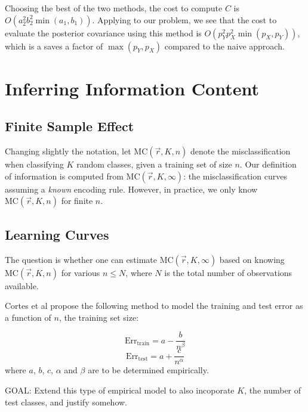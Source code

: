 \documentclass[12pt]{article}
\begin{document}
Choosing the best of the two methods, the cost to compute $C$ is $O(a_2^2 b_2^2 \min(a_1, b_1))$.
Applying to our problem, we see that the cost to evaluate the posterior covariance using this method is $O(p_Y^2 p_X^2 \min(p_X, p_Y))$, which is a saves a factor of $\max(p_Y, p_X)$ compared to the naive approach.


\section{Inferring Information Content}

\subsection{Finite Sample Effect}

Changing slightly the notation, let $\text{MC}(\vec{r}, K, n)$ denote
the misclassification when classifying $K$ random classes, given a
training set of size $n$.  Our definition of information is computed
from $\text{MC}(\vec{r}, K, \infty)$: the misclassification curves
assuming a \emph{known} encoding rule.  However, in practice, we only
know $\text{MC}(\vec{r}, K, n)$ for finite $n$.

\subsection{Learning Curves}

The question is whether one can estimate $\text{MC}(\vec{r},
K, \infty)$ based on knowing $\text{MC}(\vec{r}, K, n)$ for various
$n \leq N$, where $N$ is the total number of observations available.

Cortes et al propose the following method to model the training and
test error as a function of $n$, the training set size:

\[
\text{Err}_{\text{train}} = a - \frac{b}{n^\beta}
\]
\[
\text{Err}_{\text{test}} = a + \frac{c}{n^\alpha}
\]
where $a$, $b$, $c$, $\alpha$ and $\beta$ are to be determined
empirically.

GOAL: Extend this type of empirical model to also incoporate $K$, the
number of test classes, and justify somehow.
\end{document}
